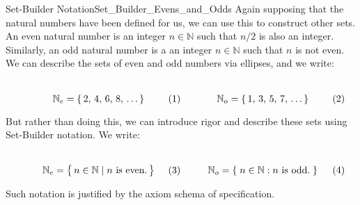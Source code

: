         \begin{lexample}{Set-Builder Notation}{Set_Builder_Evens_and_Odds}
            Again supposing that the natural numbers have been defined for us,
            we can use this to construct other sets. An even natural number
            is an integer $n\in\mathbb{N}$ such that $n/2$ is also an integer.
            Similarly, an odd natural number is a an integer $n\in\mathbb{N}$
            such that $n$ is not even. We can describe the sets of even and
            odd numbers via ellipses, and we write:
            \par
            \begin{subequations}
                \begin{minipage}[b]{0.49\textwidth}
                    \centering
                    \begin{equation}
                        \mathbb{N}_{e}=\{\,2,\,4,\,6,\,8,\,\dots\,\}
                    \end{equation}
                \end{minipage}
                \hfill
                \begin{minipage}[b]{0.49\textwidth}
                    \centering
                    \begin{equation}
                        \mathbb{N}_{o}=\{\,1,\,3,\,5,\,7,\,\dots\,\}
                    \end{equation}
                \end{minipage}
            \end{subequations}
            \par\vspace{2.5ex}
            But rather than doing this, we can introduce rigor and describe
            these sets using Set-Builder notation. We write:
            \par
            \begin{subequations}
                \begin{minipage}[b]{0.49\textwidth}
                    \centering
                    \begin{equation}
                        \mathbb{N}_{e}
                        =\big\{\,n\in\mathbb{N}\;|\;n\textrm{ is even.}\,\big\}
                    \end{equation}
                \end{minipage}
                \hfill
                \begin{minipage}[b]{0.49\textwidth}
                    \centering
                    \begin{equation}
                        \mathbb{N}_{o}=\{\;n\in\mathbb{N}:
                                           n\textrm{ is odd.}\;\}
                    \end{equation}
                \end{minipage}
            \end{subequations}
            \par\vspace{2.5ex}
            Such notation is justified by the axiom schema of specification.
        \end{lexample}
